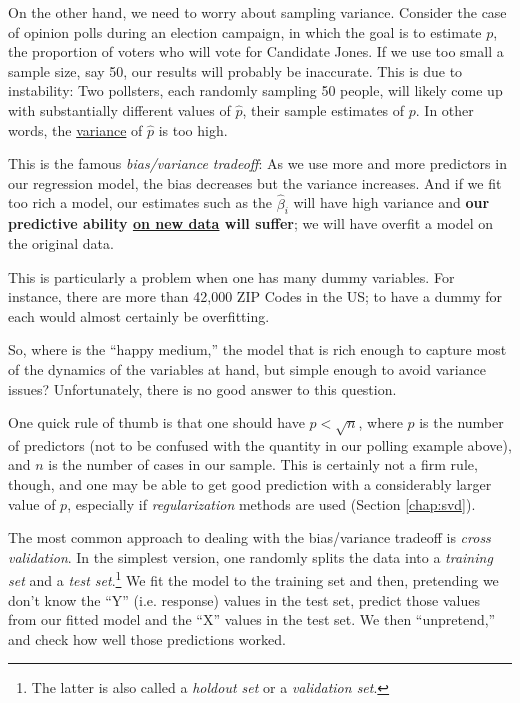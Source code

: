 On the other hand, we need to worry about sampling variance.  Consider
the case of opinion polls during an election campaign, in which the goal
is to estimate $p$, the proportion of voters who will vote for Candidate
Jones.  If we use too small a sample size, say 50, our results will
probably be inaccurate.  This is due to instability:  Two pollsters,
each randomly sampling 50 people, will likely come up with substantially
different values of $\widehat{p}$, their sample estimates of $p$.  In
other words, the \underline{variance} of $\widehat{p}$ is too high.

This is the famous \textit{bias/variance tradeoff}:  As we use more and
more predictors in our regression model, the bias decreases but the
variance increases.  And if we fit too rich a model, our estimates such
as the $\widehat{\beta}_i$ will have high variance and \textbf{our
predictive ability \underline{on new data} will suffer}; we will have
overfit a model on the original data.

This is particularly a problem when one has many dummy variables. For
instance, there are more than 42,000 ZIP Codes in the US; to have a
dummy for each would almost certainly be overfitting.

So, where is the ``happy medium,'' the model that is rich enough to
capture most of the dynamics of the variables at hand, but simple enough
to avoid variance issues?  Unfortunately, there is no good answer to
this question.

One quick rule of thumb is that one should have $p < \sqrt{n}$, where $p$
is the number of predictors (not to be confused with the quantity in our
polling example above), and $n$ is the number of cases in our sample.
This is certainly not a firm rule, though, and one may be able to get
good prediction with a considerably larger value of $p$, especially if
\textit{regularization} methods are used (Section \ref{chap:svd}).

The most common approach to dealing with the bias/variance tradeoff is
\textit{cross validation}.  In the simplest version, one randomly splits
the data into a \textit{training set} and a \textit{test
set}.\footnote{The latter is also called a \textit{holdout set} or a
\textit{validation set}.}  We fit the model to the training set and
then, pretending we don't know the ``Y'' (i.e. response) values in the
test set, predict those values from our fitted model and the ``X''
values in the test set.  We then ``unpretend,'' and check how well those
predictions worked. 

